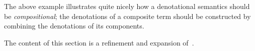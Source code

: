 The above example illustrates quite nicely how a denotational semantics should
be \emph{compositional}; the denotations of a composite term should be
constructed by combining the denotations of its components.

\begin{remark}
    The content of this section is a refinement and expansion
    of~\cite[Section 3]{ghica2024fully}.
\end{remark}




